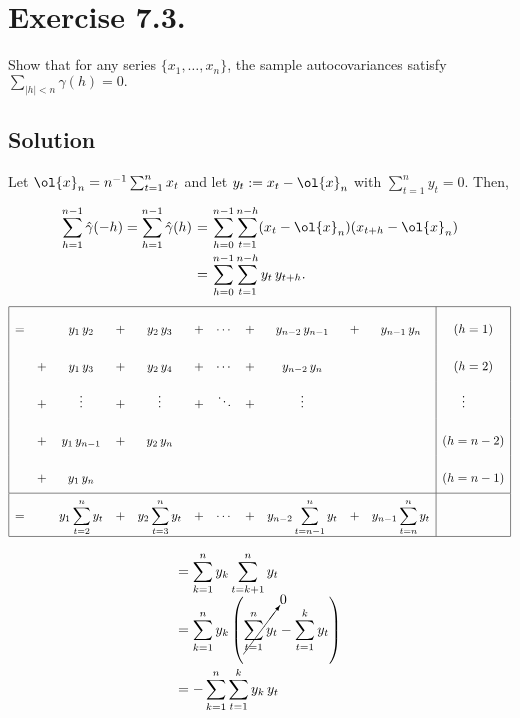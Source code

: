 \newpage
\section*{Exercise 7.3.}


Show that for any series $\{x_{1}, \dots, x_{n} \}$, the sample autocovariances satisfy $\sum_{| h | < n} \hat{\gamma} ( h )=0.$ 

\subsection*{Solution}

Let $\ol{x}_n = n^{-1} \sum_{t = 1}^{n} x_t$ and let $y_t := x_t-\ol{x}_n$ with $ \sum_{t = 1}^n y_t = 0$. Then, 
\[ \everymath{\displaystyle}
\arraycolsep=1.8pt\def\arraystretch{2.5}
\begin{array}{rcl}
    \sum_{h = 1}^{n-1} \hat{\gamma} ( -h ) = \sum_{h = 1}^{n-1} \hat{\gamma} ( h ) 
    & = & \sum_{h = 0}^{n-1} \sum_{t = 1}^{n-h} (x_t-\ol{x}_n)(x_{t+h}-\ol{x}_n)\\
    & = & \sum_{h = 0}^{n-1}\sum_{t = 1}^{n-h} y_t\, y_{t+h}.
\end{array} \]
\[\everymath{\displaystyle} 
\begin{array}{|rcccccccccc|c|}
    \hline
    =& & y_1\, y_2 & + & y_2\, y_3 & + & \cdots & + & y_{n-2}\, y_{n-1} & + & y_{n-1}\, y_n &  (h = 1)\\
    &+ & y_1\, y_3 & + & y_2\, y_4 & + & \cdots & + & y_{n-2}\, y_n & & &  (h = 2) \\
    &+ & \vdots & + & \vdots & + & \ddots & + & \vdots &&& \hfill \vdots \hfill \hfill \\
    &+ & y_1\, y_{n-1} & + & y_2\, y_n &&&&&&& (h = n-2)\\
    &+ & y_1\, y_n &&&&&&&&& (h = n-1)\\\hline
    = & & y_1 \sum_{t = 2}^{n} y_{t} & + & y_2 \sum_{t = 3}^{n} y_{t} & + & \cdots & + &  y_{n-2} \sum_{t = n-1}^{n} y_{t} & + & y_{n-1} \sum_{t = n}^{n}  y_{t} &\\
    \hline
\end{array} \]
\[ \everymath{\displaystyle}
\arraycolsep=1.8pt\def\arraystretch{2.5}
\begin{array}{lcl}
    = \sum_{k = 1}^{n} y_k \sum_{t = k+1}^{n} y_t\\
    = \sum_{k = 1}^{n} y_k \left(\cancelto{0}{\sum_{t = 1}^{n} y_t} - \sum_{t = 1}^{k} y_t  \right)\\
    = - \sum_{k = 1}^{n} \sum_{t = 1}^{k} y_k\, y_t
\end{array} \]
